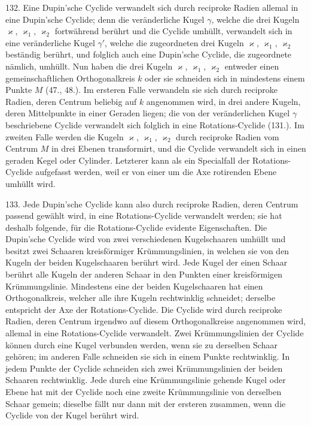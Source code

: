 132. Eine Dupin'sche Cyclide verwandelt sich durch
reciproke Radien allemal in eine Dupin'sche Cyclide; denn
die ver\"anderliche Kugel $\gamma$, welche die drei Kugeln $\varkappa$, $\varkappa_1$, $\varkappa_2$
fortw\"ahrend ber\"uhrt und die Cyclide umh\"ullt, verwandelt
sich in eine ver\"anderliche Kugel $\gamma'$, welche die zugeordneten
drei Kugeln $\varkappa$, $\varkappa_1$, $\varkappa_2$ best\"andig ber\"uhrt, und folglich auch
eine Dupin'sche Cyclide, die zugeordnete n\"amlich, umh\"ullt.
Nun haben die drei Kugeln $\varkappa$, $\varkappa_1$, $\varkappa_2$ entweder einen gemeinschaftlichen
Orthogonalkreis $k$ oder sie schneiden sich in
mindestens einem Punkte $M$ (47., 48.). Im ersteren Falle
verwandeln sie sich durch reciproke Radien, deren Centrum
beliebig auf $k$ angenommen wird, in drei andere Kugeln,
deren Mittelpunkte in einer Geraden liegen; die von der ver\"anderlichen
Kugel $\gamma$ beschriebene Cyclide verwandelt sich
folglich in eine Rotations-Cyclide (131.). Im zweiten Falle
werden die Kugeln $\varkappa$, $\varkappa_1$, $\varkappa_2$ durch reciproke Radien vom
Centrum $M$ in drei Ebenen transformirt, und die Cyclide verwandelt
sich in einen geraden Kegel oder Cylinder. Letzterer
kann als ein Specialfall der Rotations-Cyclide aufgefasst werden,
weil er von einer um die Axe rotirenden Ebene umh\"ullt wird.

133. Jede Dupin'sche Cyclide kann also durch reciproke
Radien, deren Centrum passend gew\"ahlt wird, in eine Rotations-Cyclide
verwandelt werden; sie hat deshalb folgende,
f\"ur die Rotations-Cyclide evidente Eigenschaften. Die Dupin'sche
Cyclide wird von zwei verschiedenen Kugelschaaren
umh\"ullt und besitzt zwei Schaaren kreisf\"ormiger Kr\"ummungslinien,
in welchen sie von den Kugeln der beiden Kugelschaaren
ber\"uhrt wird. Jede Kugel der einen Schaar ber\"uhrt
alle Kugeln der anderen Schaar in den Punkten einer kreisf\"ormigen
Kr\"ummungslinie. Mindestens eine der beiden Kugelschaaren
hat einen Orthogonalkreis, welcher alle ihre Kugeln
rechtwinklig schneidet; derselbe entspricht der Axe der
Rotations-Cyclide. Die Cyclide wird durch reciproke Radien,
deren Centrum irgendwo auf diesem Orthogonalkreise angenommen
wird, allemal in eine Rotations-Cyclide verwandelt.
Zwei Kr\"ummungslinien der Cyclide k\"onnen durch eine Kugel
verbunden werden, wenn sie zu derselben Schaar geh\"oren;
im anderen Falle schneiden sie sich in einem Punkte rechtwinklig.
In jedem Punkte der Cyclide schneiden sich zwei
Kr\"ummungslinien der beiden Schaaren rechtwinklig. Jede durch
eine Kr\"ummungslinie gehende Kugel oder Ebene hat mit der
Cyclide noch eine zweite Kr\"ummungslinie von derselben Schaar
gemein; dieselbe f\"allt nur dann mit der ersteren zusammen,
wenn die Cyclide von der Kugel ber\"uhrt wird.

